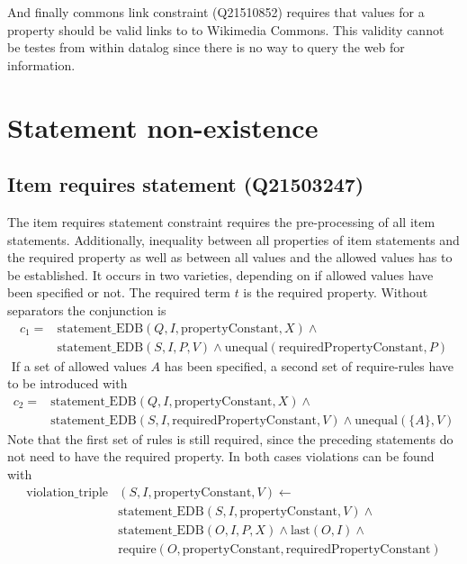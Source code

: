 \documentclass[hyperref,bachelorofscience,fleqn]{cgvpub}
\begin{document}
And finally commons link constraint (Q21510852) requires that values for a property should be valid links to to Wikimedia Commons. This validity cannot be testes from within datalog since there is no way to query the web for information.

\section{Statement non-existence}\label{sec_statement_non-existence}


\subsection{Item requires statement (Q21503247)}
The item requires statement constraint requires the pre-processing of all item statements. Additionally, inequality between all properties of item statements and the required property as well as between all values and the allowed values has to be established. It occurs in two varieties, depending on if allowed values have been specified or not. The required term \(t\) is the  required property. Without separators the conjunction is
\begin{equation*}
\begin{split}
c_1 = &\text{statement\_EDB}(Q, I, \text{propertyConstant}, X) \wedge{} \\
&\text{statement\_EDB}(S, I, P, V) \wedge \text{unequal}(\text{requiredPropertyConstant}, P)
\end{split}
\end{equation*} \(\)
If a set of allowed values \(A\) has been specified, a second set of require-rules have to be introduced with
\begin{equation*}
\begin{split}
c_2 = &\text{statement\_EDB}(Q, I, \text{propertyConstant}, X) \wedge{} \\
&\text{statement\_EDB}(S, I, \text{requiredPropertyConstant}, V) \wedge \text{unequal}(\{A\}, V)
\end{split}
\end{equation*}
Note that the first set of rules is still required, since the preceding statements do not need to have the required property. In both cases violations can be found with
\begin{equation*}
\begin{split}
\text{violation\_triple}&(S, I, \text{propertyConstant}, V) \leftarrow \\
&\text{statement\_EDB}(S, I, \text{propertyConstant}, V) \wedge{} \\
&\text{statement\_EDB}(O, I, P, X) \wedge \text{last}(O, I) \wedge{} \\
&\text{require}(O, \text{propertyConstant}, \text{requiredPropertyConstant})
\end{split}
\end{equation*}
\end{document}

